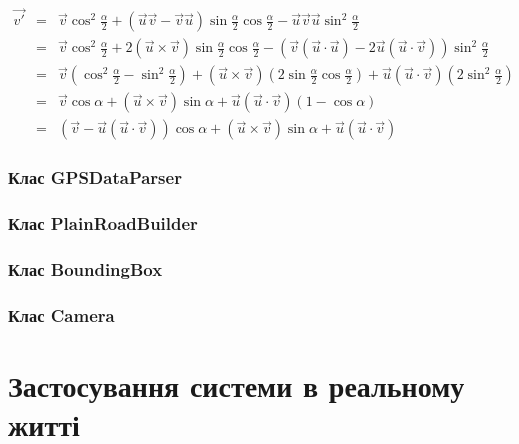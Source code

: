\documentclass[simple,a4paper,14pt,ukrainian,utf8]{eskdtext}
\begin{document}
            \begin{displaymath}
                \begin{array}{lll}
                    \vec{v'} &=& \vec{v} \cos^2 \frac{\alpha}{2} + (\vec{u}\vec{v} - \vec{v}\vec{u}) \sin \frac{\alpha}{2} \cos \frac{\alpha}{2} - \vec{u}\vec{v}\vec{u} \sin^2 \frac{\alpha}{2} \\
                    &=& \vec{v} \cos^2 \frac{\alpha}{2} + 2 (\vec{u} \times \vec{v}) \sin \frac{\alpha}{2} \cos \frac{\alpha}{2} - (\vec{v} (\vec{u} \cdot \vec{u}) - 2 \vec{u} (\vec{u} \cdot \vec{v})) \sin^2 \frac{\alpha}{2} \\
                    &=& \vec{v} (\cos^2 \frac{\alpha}{2} - \sin^2 \frac{\alpha}{2}) + (\vec{u} \times \vec{v}) (2 \sin \frac{\alpha}{2} \cos \frac{\alpha}{2}) + \vec{u} (\vec{u} \cdot \vec{v}) (2 \sin^2 \frac{\alpha}{2}) \\
                    &=& \vec{v} \cos \alpha + (\vec{u} \times \vec{v}) \sin \alpha + \vec{u} (\vec{u} \cdot \vec{v}) (1 - \cos \alpha) \\
                    &=& (\vec{v} - \vec{u} (\vec{u} \cdot \vec{v})) \cos \alpha + (\vec{u} \times \vec{v}) \sin \alpha + \vec{u} (\vec{u} \cdot \vec{v})
                \end{array}
            \end{displaymath}

        \subsubsection{Клас GPSDataParser}

        \subsubsection{Клас PlainRoadBuilder}
        
        \subsubsection{Клас BoundingBox}

        \subsubsection{Клас Camera}
        
    \newpage \section{Застосування системи в реальному житті}
\end{document}
